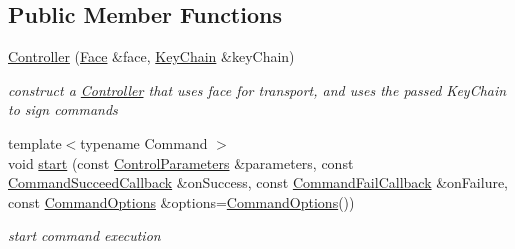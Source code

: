 \subsection*{Public Member Functions}
\begin{DoxyCompactItemize}
\item 
\hyperlink{classndn_1_1nfd_1_1Controller_a2b22f4896f0d4109cce8bf446eae5b6e}{Controller} (\hyperlink{classndn_1_1Face}{Face} \&face, \hyperlink{classndn_1_1security_1_1KeyChain}{Key\+Chain} \&key\+Chain)\hypertarget{classndn_1_1nfd_1_1Controller_a2b22f4896f0d4109cce8bf446eae5b6e}{}\label{classndn_1_1nfd_1_1Controller_a2b22f4896f0d4109cce8bf446eae5b6e}

\begin{DoxyCompactList}\small\item\em construct a \hyperlink{classndn_1_1nfd_1_1Controller}{Controller} that uses face for transport, and uses the passed Key\+Chain to sign commands \end{DoxyCompactList}\item 
{\footnotesize template$<$typename Command $>$ }\\void \hyperlink{classndn_1_1nfd_1_1Controller_a7c4bec1a46efde45f0196f1bf3e97e90}{start} (const \hyperlink{classndn_1_1nfd_1_1ControlParameters}{Control\+Parameters} \&parameters, const \hyperlink{classndn_1_1nfd_1_1Controller_a7dde1f6afdc8f2b58bc3dc6b4661a4f4}{Command\+Succeed\+Callback} \&on\+Success, const \hyperlink{classndn_1_1nfd_1_1Controller_ad1a5fe51dfacb28c3fb624f03e9f50bb}{Command\+Fail\+Callback} \&on\+Failure, const \hyperlink{classndn_1_1nfd_1_1CommandOptions}{Command\+Options} \&options=\hyperlink{classndn_1_1nfd_1_1CommandOptions}{Command\+Options}())\hypertarget{classndn_1_1nfd_1_1Controller_a7c4bec1a46efde45f0196f1bf3e97e90}{}\label{classndn_1_1nfd_1_1Controller_a7c4bec1a46efde45f0196f1bf3e97e90}

\begin{DoxyCompactList}\small\item\em start command execution \end{DoxyCompactList}\end{DoxyCompactItemize}
